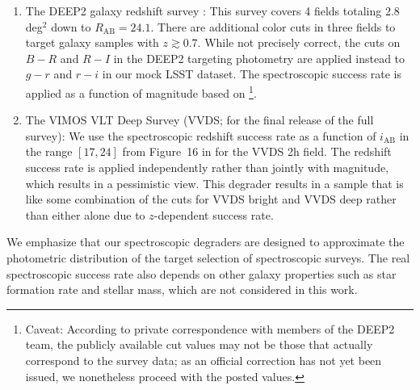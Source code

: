 \documentclass[fleqn,usenatbib,useAMS]{mnras}
\newcommand{\PersonalTag}[3]{{\color{#2}{$^{#1}$ [#3}]}}
\newcommand{\aim}[1]{\PersonalTag{Alex}{violet}{#1}}
\newcommand{\rachel}[1]{\PersonalTag{Rachel}{orange}{#1}}
\newcommand{\refresponse}[1]{{\color{black}{#1}}}
\begin{document}
\begin{enumerate}
\item The DEEP2 galaxy redshift survey \citep{2013ApJS..208....5N}: 
This survey covers 4 fields totaling 2.8 deg$^2$ down to $R_\text{AB}=24.1$.  
There are additional color cuts in three fields to target galaxy samples with $z \gtrsim 0.7$.  
While not precisely correct, the cuts on $B-R$ and $R-I$ in the DEEP2 targeting photometry are applied instead to $g-r$ and $r-i$ in our mock LSST dataset.  
The spectroscopic success rate is applied as a function of magnitude based on \citet{2013ApJS..208....5N}\footnote{Caveat: According to private correspondence with members of the DEEP2 team, the publicly available cut values may not be those that actually correspond to the survey data; as an official correction has not yet been issued, we nonetheless proceed with the posted values. \refresponse{We refer to our dataset implementing these cuts as 'pseudo-DEEP2' in order to avoid potential confusion.} 
}.
    \item The VIMOS VLT Deep Survey (VVDS; \citealt{2013A&A...559A..14L} for the final release of the full survey): 
    We use the spectroscopic redshift success rate as a function of $i_\text{AB}$ in the range $[17, 24]$ from Figure~16 in \cite{2005A&A...439..845L} for the VVDS 2h field.  
    The redshift success rate is applied independently rather than jointly with magnitude, which results in a pessimistic view. This degrader results in a sample that is like some combination of the cuts for VVDS bright and VVDS deep rather than either alone due to $z$-dependent success rate.
%    
\end{enumerate}


{We emphasize that our spectroscopic degraders are designed to approximate the photometric distribution of the target selection of spectroscopic surveys. The real spectroscopic success rate also depends on other galaxy properties such as star formation rate and stellar mass, which are not considered in this work. }
\end{document}
